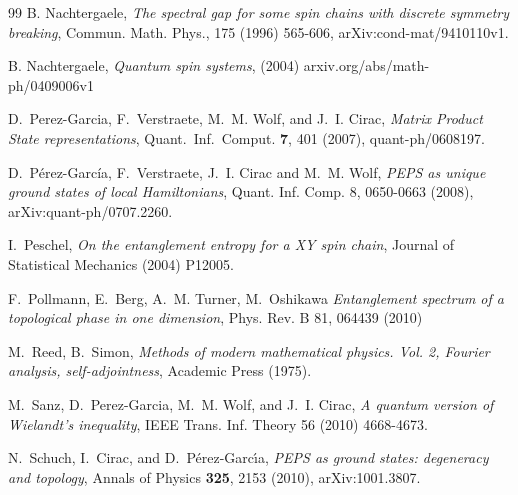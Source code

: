 \documentclass[cmp]{svjour}
\begin{document}
\begin{thebibliography}{99}
    B. Nachtergaele,
    \newblock \emph{The spectral gap for some spin chains with discrete symmetry breaking},
    \newblock Commun. Math. Phys., 175 (1996) 565-606, arXiv:cond-mat/9410110v1.

    B. Nachtergaele,
    \newblock \emph{Quantum spin systems},
    \newblock (2004) arxiv.org/abs/math-ph/0409006v1

    D.~Perez-Garcia, F.~Verstraete, M.~M. Wolf, and J.~I. Cirac,
    \newblock \emph{Matrix Product State representations},
    \newblock Quant.\ Inf.\ Comput. {\bf 7}, 401 (2007), quant-ph/0608197.


    D.~Pérez-García, F.~Verstraete, J.~I. Cirac and M.~M. Wolf, \emph{PEPS as unique ground states of local Hamiltonians},
    \newblock Quant. Inf. Comp. 8, 0650-0663 (2008), arXiv:quant-ph/0707.2260.



    I.~Peschel,
    \newblock \emph{On the entanglement entropy for a XY spin chain},
    \newblock Journal of Statistical Mechanics (2004) P12005.

    F.~Pollmann, E.~Berg, A.~M. Turner, M.~Oshikawa
    \newblock \emph{Entanglement spectrum of a topological phase in one dimension},
    \newblock Phys. Rev. B 81, 064439 (2010)


    M.~Reed, B.~Simon,
    \newblock \emph{Methods of modern mathematical physics. Vol. 2, Fourier analysis, self-adjointness},
    \newblock Academic Press (1975).

     M.~Sanz, D.~Perez-Garcia, M.~M. Wolf, and J.~I. Cirac,
    \newblock \emph{A quantum version of Wielandt's inequality},
    \newblock IEEE Trans. Inf. Theory 56 (2010) 4668-4673.



    N.~{Schuch}, I.~{Cirac}, and D.~{P{\'e}rez-Garc{\'{\i}}a},
    \newblock \emph{PEPS as ground states: degeneracy and topology},
    \newblock Annals of Physics {\bf 325}, 2153 (2010), arXiv:1001.3807.





\end{thebibliography}
\end{document}
